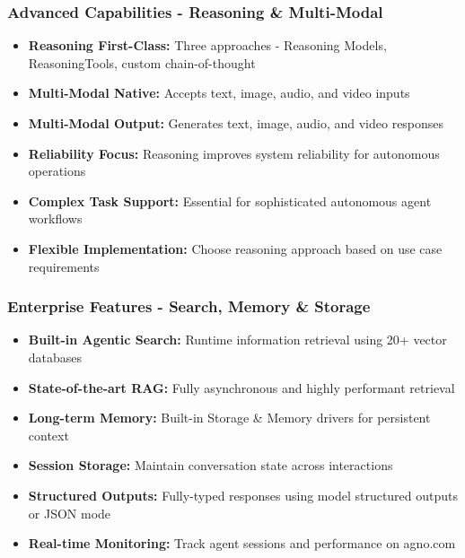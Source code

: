 \begin{frame}[fragile]\frametitle{Advanced Capabilities - Reasoning \& Multi-Modal}
      \begin{itemize}
	\item \textbf{Reasoning First-Class:} Three approaches - Reasoning Models, ReasoningTools, custom chain-of-thought
	\item \textbf{Multi-Modal Native:} Accepts text, image, audio, and video inputs
	\item \textbf{Multi-Modal Output:} Generates text, image, audio, and video responses
	\item \textbf{Reliability Focus:} Reasoning improves system reliability for autonomous operations
	\item \textbf{Complex Task Support:} Essential for sophisticated autonomous agent workflows
	\item \textbf{Flexible Implementation:} Choose reasoning approach based on use case requirements
	  \end{itemize}
\end{frame}

\begin{frame}[fragile]\frametitle{Enterprise Features - Search, Memory \& Storage}
      \begin{itemize}
	\item \textbf{Built-in Agentic Search:} Runtime information retrieval using 20+ vector databases
	\item \textbf{State-of-the-art RAG:} Fully asynchronous and highly performant retrieval
	\item \textbf{Long-term Memory:} Built-in Storage \& Memory drivers for persistent context
	\item \textbf{Session Storage:} Maintain conversation state across interactions
	\item \textbf{Structured Outputs:} Fully-typed responses using model structured outputs or JSON mode
	\item \textbf{Real-time Monitoring:} Track agent sessions and performance on agno.com
	  \end{itemize}
\end{frame}


